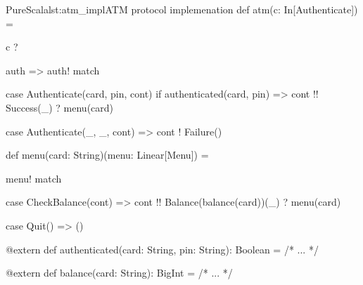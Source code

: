 \documentclass[a4paper,twoside]{article}
\begin{document}
\begin{Code}{PureScala}{lst:atm_impl}{ATM protocol implemenation}
def atm(c: In[Authenticate]) = {
  c ? { auth => auth! match {  
    case Authenticate(card, pin, cont) if authenticated(card, pin) =>
      cont !! Success(_) ? menu(card)
  
    case Authenticate(_, _, cont)  =>
      cont ! Failure()
  } }
}

def menu(card: String)(menu: Linear[Menu]) = {
  menu! match {
    case CheckBalance(cont) =>
      cont !! Balance(balance(card))(_) ? menu(card)

    case Quit() => ()
  }
}

@extern
def authenticated(card: String, pin: String): Boolean = {
  /* ... */
}

@extern
def balance(card: String): BigInt = {
  /* ... */
}
\end{Code}
\end{document}
